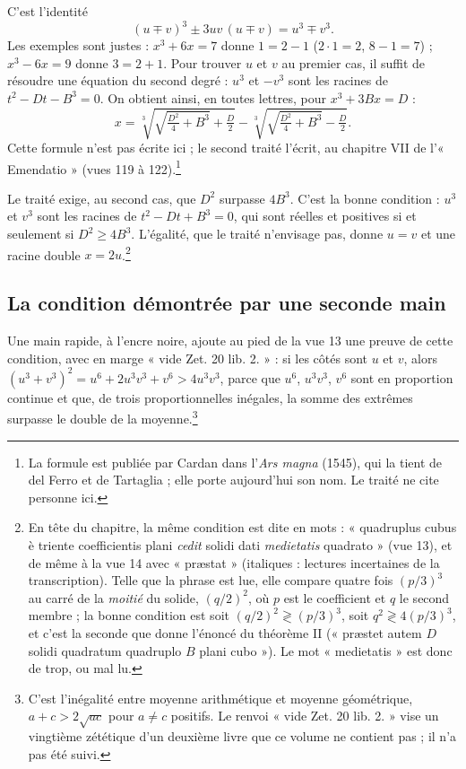 \documentclass[11pt,a4paper]{article}
\begin{document}
C'est l'identité
\[ (u \mp v)^3 \pm 3uv\,(u \mp v) = u^3 \mp v^3 . \]
Les exemples sont justes : $x^3 + 6x = 7$ donne $1 = 2 - 1$ ($2 \cdot 1 = 2$,
$8 - 1 = 7$) ; $x^3 - 6x = 9$ donne $3 = 2 + 1$. Pour trouver $u$ et $v$ au
premier cas, il suffit de résoudre une équation du second degré : $u^3$ et
$-v^3$ sont les racines de $t^2 - Dt - B^3 = 0$. On obtient ainsi, en toutes
lettres, pour $x^3 + 3Bx = D$ :
\[ x = \sqrt[3]{\sqrt{\tfrac{D^2}{4} + B^3} + \tfrac{D}{2}}
     - \sqrt[3]{\sqrt{\tfrac{D^2}{4} + B^3} - \tfrac{D}{2}} . \]
Cette formule n'est pas écrite ici ; le second traité l'écrit, au chapitre VII
de l'« Emendatio » (vues 119 à 122).\footnote{La formule est publiée par Cardan
dans l'\emph{Ars magna} (1545), qui la tient de del Ferro et de Tartaglia ; elle
porte aujourd'hui son nom. Le traité ne cite personne ici.}

Le traité exige, au second cas, que $D^2$ surpasse $4B^3$. C'est la bonne
condition : $u^3$ et $v^3$ sont les racines de $t^2 - Dt + B^3 = 0$, qui sont
réelles et positives si et seulement si $D^2 \ge 4B^3$. L'égalité, que le
traité n'envisage pas, donne $u = v$ et une racine double $x = 2u$.\footnote{En
tête du chapitre, la même condition est dite en mots : « quadruplus cubus è
triente coefficientis plani \emph{cedit} solidi dati \emph{medietatis}
quadrato » (vue 13), et de même à la vue 14 avec « præstat » (italiques : lectures
incertaines de la transcription). Telle que la phrase est lue, elle compare
quatre fois $(p/3)^3$ au carré de la \emph{moitié} du solide, $(q/2)^2$, où $p$ est
le coefficient et $q$ le second membre ; la bonne condition est soit
$(q/2)^2 \gtrless (p/3)^3$, soit $q^2 \gtrless 4(p/3)^3$, et c'est la seconde que
donne l'énoncé du théorème II (« præstet autem $D$ solidi quadratum quadruplo $B$
plani cubo »). Le mot « medietatis » est donc de trop, ou mal lu.}

\subsection*{La condition démontrée par une seconde main}

Une main rapide, à l'encre noire, ajoute au pied de la vue 13 une preuve de
cette condition, avec en marge « vide Zet. 20 lib. 2. » : si les côtés sont
$u$ et $v$, alors $(u^3 + v^3)^2 = u^6 + 2u^3v^3 + v^6 > 4u^3v^3$, parce que
$u^6$, $u^3v^3$, $v^6$ sont en proportion continue et que, de trois
proportionnelles inégales, la somme des extrêmes surpasse le double de la
moyenne.\footnote{C'est l'inégalité entre moyenne arithmétique et moyenne
géométrique, $a + c > 2\sqrt{ac}$ pour $a \ne c$ positifs. Le renvoi « vide Zet. 20
lib. 2. » vise un vingtième zététique d'un deuxième livre que ce volume ne
contient pas ; il n'a pas été suivi.}
\end{document}

